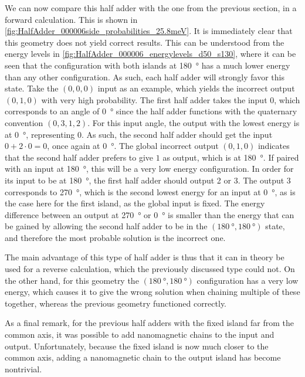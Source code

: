 \documentclass[11pt,a4paper,english,twoside]{article}
\begin{document}
We can now compare this half adder with the one from the previous section, in a forward calculation. This is shown in \cref{fig:HalfAdder_000006side_probabilities_25.8meV}. It is immediately clear that this geometry does not yield correct results. This can be understood from the energy levels in \cref{fig:HalfAdder_000006_energylevels_d50_s130}, where it can be seen that the configuration with both islands at \SI{180}{\degree} has a much lower energy than any other configuration. As such, each half adder will strongly favor this state. Take the $(0,0,0)$ input as an example, which yields the incorrect output $(0,1,0)$ with very high probability. The first half adder takes the input 0, which corresponds to an angle of \SI{0}{\degree} since the half adder functions with the quaternary convention $(0,3,1,2)$. For this input angle, the output with the lowest energy is at \SI{0}{\degree}, representing 0. As such, the second half adder should get the input $0+2\cdot0=0$, once again at \SI{0}{\degree}. The global incorrect output $(0,1,0)$ indicates that the second half adder prefers to give $1$ as output, which is at \SI{180}{\degree}. If paired with an input at \SI{180}{\degree}, this will be a very low energy configuration. In order for its input to be at \SI{180}{\degree}, the first half adder should output 2 or 3. The output 3 corresponds to \SI{270}{\degree}, which is the second lowest energy for an input at \SI{0}{\degree}, as is the case here for the first island, as the global input is fixed. The energy difference between an output at \SI{270}{\degree} or \SI{0}{\degree} is smaller than the energy that can be gained by allowing the second half adder to be in the $(\SI{180}{\degree}, \SI{180}{\degree})$ state, and therefore the most probable solution is the incorrect one. \par
The main advantage of this type of half adder is thus that it can in theory be used for a reverse calculation, which the previously discussed type could not. On the other hand, for this geometry the $(\SI{180}{\degree}, \SI{180}{\degree})$ configuration has a very low energy, which causes it to give the wrong solution when chaining multiple of these together, whereas the previous geometry functioned correctly.

As a final remark, for the previous half adders with the fixed island far from the common axis, it was possible to add nanomagnetic chains to the input and output. Unfortunately, because the fixed island is now much closer to the common axis, adding a nanomagnetic chain to the output island has become nontrivial.
\end{document}
